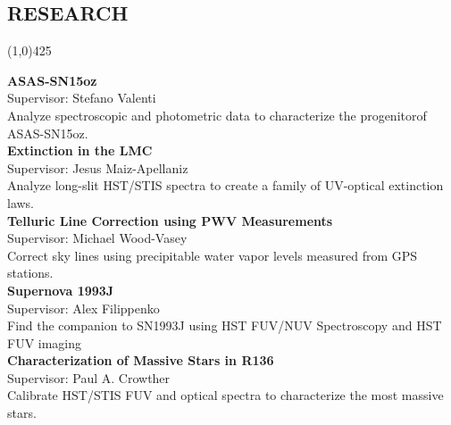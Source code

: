 \documentclass{res}
\begin{document}
\begin{resume}
\section{RESEARCH} 
\vspace{-.2in}
\begin{center}
\line(1,0){425}
\end{center}
\vspace{-.3in}
\vspace{0.1in}
{\bf ASAS-SN15oz} \hspace{179pt} \\
\hspace*{24pt}Supervisor: Stefano Valenti\\
\hspace*{24pt}Analyze spectroscopic and photometric data to characterize the progenitorof ASAS-SN15oz.\\
{\bf Extinction in the LMC}\hspace{149.95pt} \\
\hspace*{24pt}Supervisor: Jesus Maiz-Apellaniz\\
\hspace*{24pt}Analyze long-slit HST/STIS spectra to create a family of UV-optical extinction laws. \\
{\bf Telluric Line Correction using PWV Measurements} \hspace{2pt} \\
\hspace*{24pt}Supervisor: Michael Wood-Vasey\\
\hspace*{24pt}Correct sky lines using precipitable water vapor levels measured from GPS stations. \\
{\bf  Supernova 1993J}\hspace{180pt} \\
\hspace*{24pt}Supervisor: Alex Filippenko \\
\hspace*{24pt}Find the companion to SN1993J using HST FUV/NUV Spectroscopy and HST FUV imaging \\
{\bf  Characterization of Massive Stars in R136 } \hspace{45pt} \\
\hspace*{24pt}Supervisor: Paul A. Crowther\\
\hspace*{24pt}Calibrate HST/STIS FUV and optical spectra to characterize the most massive stars. \\

\end{resume}
\end{document}
